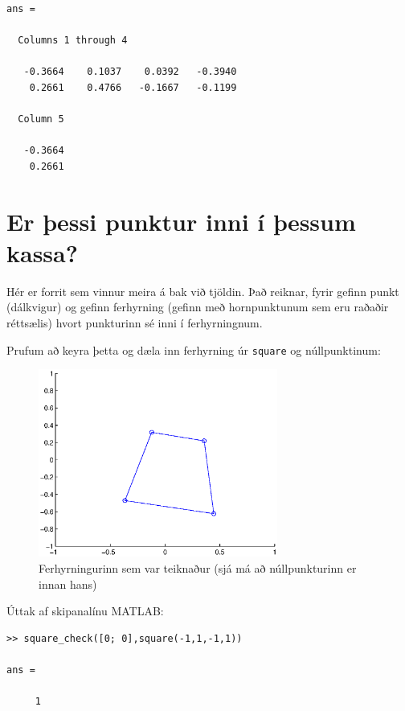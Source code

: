 \documentclass[a4]{article}
\begin{document}
\begin{flushright}
\begin{lstlisting}
ans =

  Columns 1 through 4

   -0.3664    0.1037    0.0392   -0.3940
    0.2661    0.4766   -0.1667   -0.1199

  Column 5

   -0.3664
    0.2661
\end{lstlisting}


\section{Er þessi punktur inni í þessum kassa?}

Hér er forrit sem vinnur meira á bak við tjöldin. Það reiknar, fyrir gefinn punkt (dálkvigur) og gefinn ferhyrning (gefinn með hornpunktunum sem eru raðaðir réttsælis) hvort punkturinn sé inni í ferhyrningnum.



Prufum að keyra þetta og dæla inn ferhyrning úr \lstinline{square} og núllpunktinum:

\begin{figure}[h!]
\centering
\includegraphics[width=0.7\textwidth]{sqchdaemi.eps}
\caption{Ferhyrningurinn sem var teiknaður (sjá má að núllpunkturinn er innan hans)}
\end{figure}

Úttak af skipanalínu MATLAB:

\begin{lstlisting}
>> square_check([0; 0],square(-1,1,-1,1))

ans =

     1
\end{lstlisting}

\section{}



\end{flushright}
\end{document}
